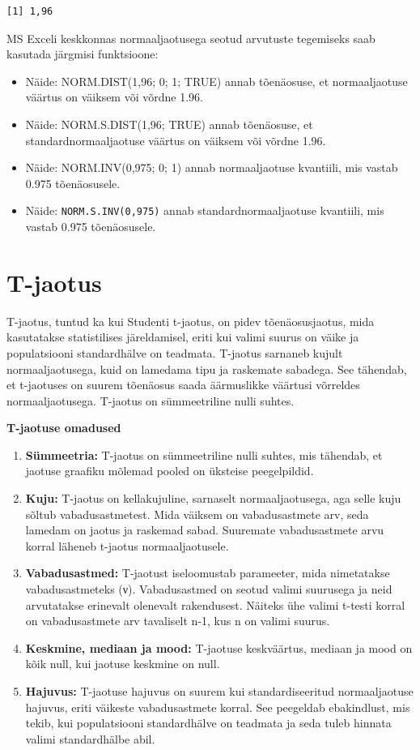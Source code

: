 \documentclass[
]{book}
\providecommand{\tightlist}{%
  \setlength{\itemsep}{0pt}\setlength{\parskip}{0pt}}
\begin{document}
\begin{verbatim}
[1] 1,96
\end{verbatim}

MS Exceli keskkonnas normaaljaotusega seotud arvutuste tegemiseks saab kasutada järgmisi funktsioone:

\begin{itemize}
\tightlist
\item
  Näide: NORM.DIST(1,96; 0; 1; TRUE) annab tõenäosuse, et normaaljaotuse väärtus on väiksem või võrdne 1.96.
\item
  Näide: NORM.S.DIST(1,96; TRUE) annab tõenäosuse, et standardnormaaljaotuse väärtus on väiksem või võrdne 1.96.
\item
  Näide: NORM.INV(0,975; 0; 1) annab normaaljaotuse kvantiili, mis vastab 0.975 tõenäosusele.
\item
  Näide: \texttt{NORM.S.INV(0,975)} annab standardnormaaljaotuse kvantiili, mis vastab 0.975 tõenäosusele.
\end{itemize}

\section{T-jaotus}\label{t-jaotus}

T-jaotus, tuntud ka kui Studenti t-jaotus, on pidev tõenäosusjaotus, mida kasutatakse statistilises järeldamisel, eriti kui valimi suurus on väike ja populatsiooni standardhälve on teadmata. T-jaotus sarnaneb kujult normaaljaotusega, kuid on lamedama tipu ja raskemate sabadega. See tähendab, et t-jaotuses on suurem tõenäosus saada äärmuslikke väärtusi võrreldes normaaljaotusega. T-jaotus on sümmeetriline nulli suhtes.

\textbf{T-jaotuse omadused}

\begin{enumerate}
\def\labelenumi{\arabic{enumi}.}
\tightlist
\item
  \textbf{Sümmeetria:} T-jaotus on sümmeetriline nulli suhtes, mis tähendab, et jaotuse graafiku mõlemad pooled on üksteise peegelpildid.
\item
  \textbf{Kuju:} T-jaotus on kellakujuline, sarnaselt normaaljaotusega, aga selle kuju sõltub vabadusastmetest. Mida väiksem on vabadusastmete arv, seda lamedam on jaotus ja raskemad sabad. Suuremate vabadusastmete arvu korral läheneb t-jaotus normaaljaotusele.
\item
  \textbf{Vabadusastmed:} T-jaotust iseloomustab parameeter, mida nimetatakse vabadusastmeteks (ν). Vabadusastmed on seotud valimi suurusega ja neid arvutatakse erinevalt olenevalt rakendusest. Näiteks ühe valimi t-testi korral on vabadusastmete arv tavaliselt n-1, kus n on valimi suurus.
\item
  \textbf{Keskmine, mediaan ja mood:} T-jaotuse keskväärtus, mediaan ja mood on kõik null, kui jaotuse keskmine on null.
\item
  \textbf{Hajuvus:} T-jaotuse hajuvus on suurem kui standardiseeritud normaaljaotuse hajuvus, eriti väikeste vabadusastmete korral. See peegeldab ebakindlust, mis tekib, kui populatsiooni standardhälve on teadmata ja seda tuleb hinnata valimi standardhälbe abil.
\end{enumerate}
\end{document}
